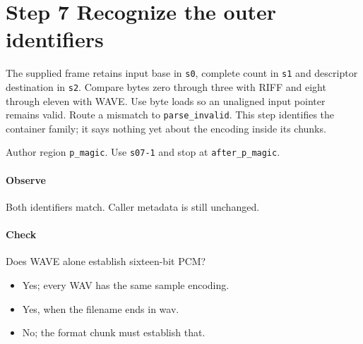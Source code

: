 \section{Step 7 Recognize the outer identifiers}\label{pcm-wav-s07}
The supplied frame retains input base in \texttt{s0}, complete count in \texttt{s1} and descriptor destination in \texttt{s2}. Compare bytes zero through three with RIFF and eight through eleven with WAVE. Use byte loads so an unaligned input pointer remains valid. Route a mismatch to \texttt{parse\_invalid}. This step identifies the container family; it says nothing yet about the encoding inside its chunks.

Author region \texttt{p\_magic}. Use \texttt{s07-1} and stop at \texttt{after\_p\_magic}.

\paragraph{Observe} Both identifiers match. Caller metadata is still unchanged.

\paragraph{Check} Does WAVE alone establish sixteen-bit PCM?
\begin{itemize}
  \item[A.] Yes; every WAV has the same sample encoding.
  \item[B.] Yes, when the filename ends in wav.
  \item[C.] No; the format chunk must establish that.
\end{itemize}
